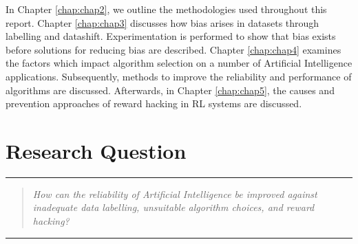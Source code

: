 In Chapter \ref{chap:chap2}, we outline the methodologies used throughout this report.
Chapter \ref{chap:chap3} discusses how bias arises in datasets through labelling and datashift.
Experimentation is performed to show that bias exists before solutions for reducing bias are described.
Chapter \ref{chap:chap4} examines the factors which impact algorithm selection on a number of Artificial Intelligence applications.
Subsequently, methods to improve the reliability and performance of algorithms are discussed.
Afterwards, in Chapter \ref{chap:chap5}, the causes and prevention approaches of reward hacking in RL systems are discussed.

\section{Research Question}
\noindent\rule{\linewidth}{0.4pt}
\begin{quotation}
\textit{How can the reliability of Artificial Intelligence be improved against 
inadequate data labelling, unsuitable algorithm choices, and reward 
hacking?}
\end{quotation}
\noindent\rule{\linewidth}{0.4pt}
